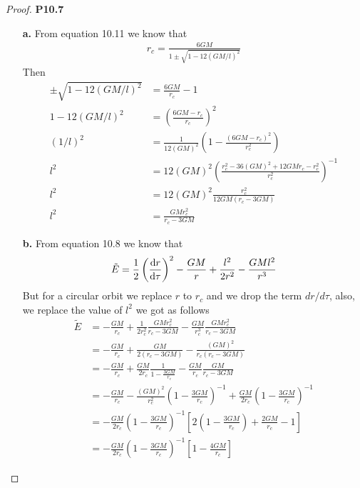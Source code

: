 \documentclass[11pt]{article}
\theoremstyle{definition}
\begin{document}
\begin{proof}{\textbf{P10.7}}
\begin{itemize}
    \item [\textbf{a.}] From equation 10.11 we know that
    \begin{align*}
        r_c = \frac{6GM}{1 \pm \sqrt{1 - 12(GM/l)^2}}
    \end{align*}
    Then 
    \begin{align*}
        \pm \sqrt{1 - 12(GM/l)^2} &= \frac{6GM}{r_c} - 1\\
        1 - 12(GM/l)^2 &= \left(\frac{6GM - r_c}{r_c}\right)^2\\
        (1/l)^2 &= \frac{1}{12(GM)^2}\left(1 - \frac{(6GM - r_c)^2}{r_c^2}\right)\\
        l^2 &= 12(GM)^2\left(\frac{r_c^2 - 36(GM)^2 +12GMr_c - r_c^2}{r_c^2}\right)^{-1}\\
        l^2 &= 12(GM)^2\frac{r_c^2}{12GM(r_c - 3GM)}\\
        l^2 &= \frac{GMr_c^2}{r_c - 3GM}
    \end{align*}
    \item [\textbf{b.}] From equation 10.8 we know that
    \begin{align*}
        \tilde{E} = \frac{1}{2}\left(\dv{r}{\tau}\right)^2
        - \frac{GM}{r} + \frac{l^2}{2r^2} - \frac{GMl^2}{r^3}
    \end{align*}
    But for a circular orbit we replace $r$ to $r_c$ and we drop the term
    $dr/d\tau$, also, we replace the value of $l^2$ we got as follows
    \begin{align*}
        \tilde{E} &=
        - \frac{GM}{r_c} + \frac{1}{2r_c^2}\frac{GMr_c^2}{r_c - 3GM}
        - \frac{GM}{r_c^3}\frac{GMr_c^2}{r_c - 3GM}\\
        &= - \frac{GM}{r_c} + \frac{GM}{2(r_c - 3GM)}
        - \frac{(GM)^2}{r_c(r_c - 3GM)}\\
        &= - \frac{GM}{r_c} + \frac{GM}{2r_c}\frac{1}{1 - \frac{3GM}{r_c}}
        - \frac{GM}{r_c}\frac{GM}{r_c - 3GM}\\
        &= - \frac{GM}{r_c} - \frac{(GM)^2}{r_c^2}\left(1 - \frac{3GM}{r_c}\right)^{-1}
        + \frac{GM}{2r_c}\left(1 - \frac{3GM}{r_c}\right)^{-1}\\
        &= - \frac{GM}{2r_c}\left(1 - \frac{3GM}{r_c}\right)^{-1}
        \left[2\left(1 - \frac{3GM}{r_c}\right) +\frac{2GM}{r_c} -1\right]\\
        &= - \frac{GM}{2r_c}\left(1 - \frac{3GM}{r_c}\right)^{-1}
        \left[1 - \frac{4GM}{r_c}\right]

\end{align*}
\end{itemize}
\end{proof}
\end{document}
